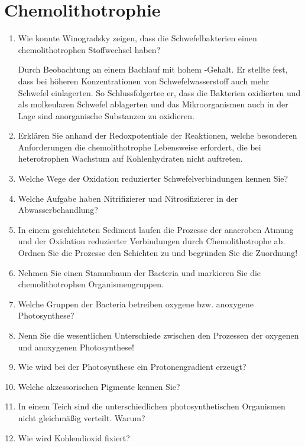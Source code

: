 
\section{Chemolithotrophie}
\begin{enumerate}
	\item Wie konnte Winogradsky zeigen, dass die Schwefelbakterien einen chemolithotrophen Stoffwechsel haben?
		
		Durch Beobachtung an einem Bachlauf mit hohem -Gehalt.
		Er stellte fest,
		dass bei höheren Konzentrationen von Schwefelwasserstoff auch mehr Schwefel einlagerten.
		So Schlussfolgertee er,
		dass die Bakterien  oxidierten und als molkeularen Schwefel ablagerten
		und das Mikroorganismen auch in der Lage sind anorganische Substanzen zu oxidieren.

	\item Erklären Sie anhand der Redoxpotentiale der Reaktionen, welche besonderen Anforderungen die chemolithotrophe Lebensweise erfordert, die bei heterotrophen Wachstum auf Kohlenhydraten nicht auftreten.
	\item Welche Wege der Oxidation reduzierter Schwefelverbindungen kennen Sie?
	\item Welche Aufgabe haben Nitrifizierer und Nitrosifizierer in der Abwasserbehandlung?
	\item In einem geschichteten Sediment laufen die Prozesse der anaeroben Atmung und der Oxidation reduzierter Verbindungen durch Chemolithotrophe ab. Ordnen Sie die Prozesse den Schichten zu und begründen Sie die Zuordnung!
	\item Nehmen Sie einen Stammbaum der Bacteria und markieren Sie die chemolithotrophen Organismengruppen. 
	\item Welche Gruppen der Bacteria betreiben oxygene bzw. anoxygene Photosynthese?
	\item Nenn Sie die wesentlichen Unterschiede zwischen den Prozessen der oxygenen und anoxygenen Photosynthese!
	\item Wie wird bei der Photosynthese ein Protonengradient erzeugt?
	\item Welche akzessorischen Pigmente kennen Sie? 
	\item In einem Teich sind die unterschiedlichen photosynthetischen Organismen nicht gleichmäßig verteilt. Warum?
	\item Wie wird Kohlendioxid fixiert?
\end{enumerate}

